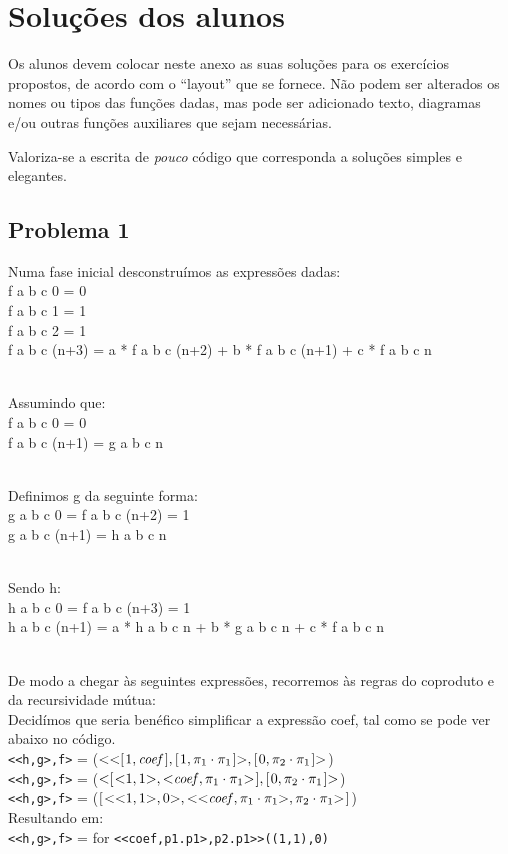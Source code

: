 \documentclass[a4paper]{article}
\newcommand{\Varid}[1]{\mathit{#1}}
\begin{document}

\section{Soluções dos alunos}\label{sec:resolucao}
Os alunos devem colocar neste anexo as suas soluções para os exercícios
propostos, de acordo com o ``layout'' que se fornece. Não podem ser
alterados os nomes ou tipos das funções dadas, mas pode ser adicionado
texto, diagramas e/ou outras funções auxiliares que sejam necessárias.

Valoriza-se a escrita de \emph{pouco} código que corresponda a soluções
simples e elegantes.

\subsection*{Problema 1}
Numa fase inicial desconstruímos as expressões dadas:
  \\f a b c 0 = 0
  \\f a b c 1 = 1
  \\f a b c 2 = 1
  \\f a b c (n+3) = a * f a b c (n+2) + b * f a b c (n+1) + c * f a b c n

\\Assumindo que:
  \\f a b c 0 = 0
  \\f a b c (n+1) = g a b c n
  
\\Definimos g da seguinte forma:
 \\g a b c 0 = f a b c (n+2) = 1
 \\g a b c (n+1) = h a b c n

\\Sendo h:
 \\ h a b c 0 = f a b c (n+3) = 1
 \\ h a b c (n+1) = a * h a b c n + b * g a b c n + c * f a b c n 

\\De modo a chegar às seguintes expressões, recorremos às regras do coproduto e da recursividade mútua:
\\Decidímos que seria benéfico simplificar a expressão coef, tal como se pode ver abaixo no código.
  \\\texttt{<<h,g>,f>} = (\ensuremath{\mathbin{<<}[\mskip1.5mu \mathrm{1},\Varid{coef}\mskip1.5mu],[\mskip1.5mu \mathrm{1},\p1\comp \p1\mskip1.5mu]\mathbin{>},[\mskip1.5mu \mathrm{0},\p2\comp \p1\mskip1.5mu]\mathbin{>}})
  \\\texttt{<<h,g>,f>} = (\ensuremath{\mathbin{<}[\mskip1.5mu \mathbin{<}\mathrm{1},\mathrm{1}\mathbin{>},\mathbin{<}\Varid{coef},\p1\comp \p1\mathbin{>}\mskip1.5mu],[\mskip1.5mu \mathrm{0},\p2\comp \p1\mskip1.5mu]\mathbin{>}})
  \\\texttt{<<h,g>,f>} = (\ensuremath{[\mskip1.5mu \mathbin{<<}\mathrm{1},\mathrm{1}\mathbin{>},\mathrm{0}\mathbin{>},\mathbin{<<}\Varid{coef},\p1\comp \p1\mathbin{>},\p2\comp \p1\mathbin{>}\mskip1.5mu]})  
\\Resultando em:
  \\\texttt{<<h,g>,f>} = for \texttt{<<coef,p1.p1>,p2.p1>>((1,1),0)}
\end{document}
